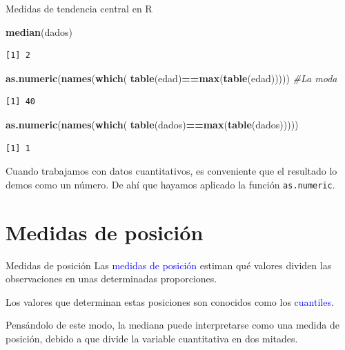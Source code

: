 \documentclass[
  ignorenonframetext,
]{beamer}
\newenvironment{Shaded}{\begin{snugshade}}{\end{snugshade}}
\newcommand{\CommentTok}[1]{\textcolor[rgb]{0.56,0.35,0.01}{\textit{#1}}}
\newcommand{\FunctionTok}[1]{\textcolor[rgb]{0.13,0.29,0.53}{\textbf{#1}}}
\newcommand{\NormalTok}[1]{#1}
\newcommand{\SpecialCharTok}[1]{\textcolor[rgb]{0.81,0.36,0.00}{\textbf{#1}}}
\newcommand\blue[1]{\textcolor{blue}{#1}}
\begin{document}
\begin{frame}[fragile]{Medidas de tendencia central en R}
\label{medidas-de-tendencia-central-en-r-1}
\begin{Shaded}
\begin{Highlighting}[]
\FunctionTok{median}\NormalTok{(dados)}
\end{Highlighting}
\end{Shaded}

\begin{verbatim}
[1] 2
\end{verbatim}

\begin{Shaded}
\begin{Highlighting}[]
\FunctionTok{as.numeric}\NormalTok{(}\FunctionTok{names}\NormalTok{(}\FunctionTok{which}\NormalTok{(}
  \FunctionTok{table}\NormalTok{(edad)}\SpecialCharTok{==}\FunctionTok{max}\NormalTok{(}\FunctionTok{table}\NormalTok{(edad))))) }\CommentTok{\#La moda}
\end{Highlighting}
\end{Shaded}

\begin{verbatim}
[1] 40
\end{verbatim}

\begin{Shaded}
\begin{Highlighting}[]
\FunctionTok{as.numeric}\NormalTok{(}\FunctionTok{names}\NormalTok{(}\FunctionTok{which}\NormalTok{(}
  \FunctionTok{table}\NormalTok{(dados)}\SpecialCharTok{==}\FunctionTok{max}\NormalTok{(}\FunctionTok{table}\NormalTok{(dados)))))}
\end{Highlighting}
\end{Shaded}

\begin{verbatim}
[1] 1
\end{verbatim}

Cuando trabajamos con datos cuantitativos, es conveniente que el
resultado lo demos como un número. De ahí que hayamos aplicado la
función \texttt{as.numeric}.
\end{frame}

\section{Medidas de posición}\label{medidas-de-posiciuxf3n}

\begin{frame}{Medidas de posición}
\label{medidas-de-posiciuxf3n-1}
Las \blue{medidas de posición} estiman qué valores dividen las
observaciones en unas determinadas proporciones.

Los valores que determinan estas posiciones son conocidos como los
\blue{cuantiles}.

Pensándolo de este modo, la mediana puede interpretarse como una medida
de posición, debido a que divide la variable cuantitativa en dos
mitades.
\end{frame}
\end{document}
